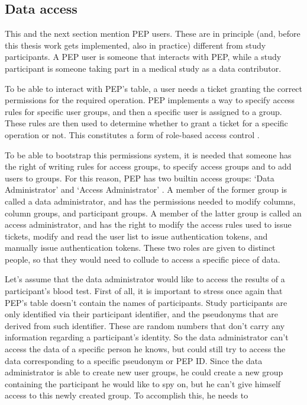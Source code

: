 \documentclass{report}
\begin{document}
\subsection{Data access} \label{data_access}
This and the next section mention PEP users. These are in principle (and, before this thesis work gets implemented, also in  practice) different from study participants. A PEP user is
someone that interacts with PEP, while a study participant is someone taking part in a medical study as a data contributor. \par
To be able to interact with PEP's table, a user needs a ticket granting the correct permissions for the required operation. PEP implements a way to specify access rules for
specific user groups, and then a specific user is assigned to a group. These rules are then used to determine whether to grant a ticket for a specific operation or not. This
constitutes a form of role-based access control \cite{rbac}. \par
To be able to bootstrap this permissions system, it is needed that someone has the right of writing rules for access groups, to specify access groups and to add users to groups. For 
this reason, PEP has two builtin access groups: \enquote*{Data Administrator} and \enquote*{Access Administrator} \cite{pep-blueprint}. A member of the former group is called a data administrator, and 
has the permissions needed to modify columns, column groups, and participant groups. A member of the latter group is called an access administrator, and has the right to modify the 
access rules used to issue tickets, modify and read the user list to issue authentication tokens, and manually issue authentication tokens. These two roles are given to distinct people, 
so that they would need to collude to access a specific piece of data. \par
Let's assume that the data administrator would like to access the results of a participant's blood test. First of 
all, it is important to stress once again that PEP's table doesn't contain the names of participants. Study participants are only identified via their participant identifier, and the 
pseudonyms that are derived from such identifier. These are random numbers that don't carry any information regarding a participant's identity. So the data administrator can't access 
the data of a specific person he knows, but could still try to access the data corresponding to a specific pseudonym or PEP ID. Since the data administrator is able to create new user 
groups, he could create a new group containing the participant he would like to spy on, but he can't give himself access to this newly created group. To accomplish this, he needs to 
\end{document}
